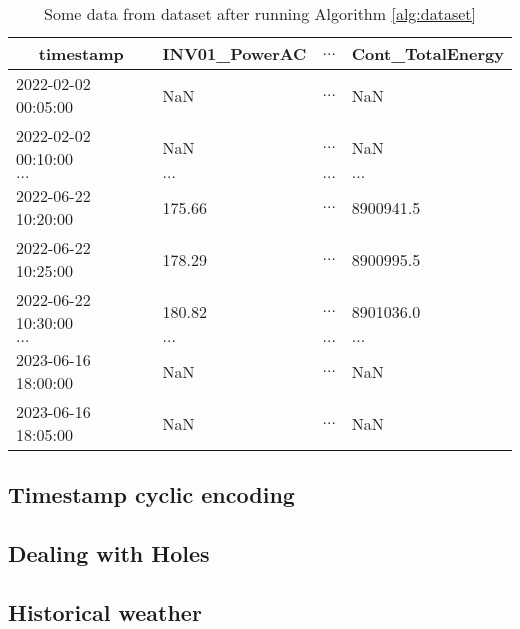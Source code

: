 \begin{table}[H]
	\begin{center}
		\begin{tabular}[c]{l|l|l|l}
			\hline
			\multicolumn{1}{c|}{\textbf{timestamp}}      &
			\multicolumn{1}{c|}{\textbf{INV01\_PowerAC}} &
			\multicolumn{1}{c|}{\textbf{$\ldots$}}       &
			\multicolumn{1}{c}{\textbf{Cont\_TotalEnergy}}                                 \\
			\hline
			2022-02-02 00:05:00                          & NaN      & $\ldots$ & NaN       \\
			2022-02-02 00:10:00                          & NaN      & $\ldots$ & NaN       \\
			$\ldots$                                     & $\ldots$ & $\ldots$ & $\ldots$  \\
			2022-06-22 10:20:00                          & 175.66   & $\ldots$ & 8900941.5 \\
			2022-06-22 10:25:00                          & 178.29   & $\ldots$ & 8900995.5 \\
			2022-06-22 10:30:00                          & 180.82   & $\ldots$ & 8901036.0 \\
			$\ldots$                                     & $\ldots$ & $\ldots$ & $\ldots$  \\
			2023-06-16 18:00:00                          & NaN      & $\ldots$ & NaN       \\
			2023-06-16 18:05:00                          & NaN      & $\ldots$ & NaN       \\
		\end{tabular}
	\end{center}
	\caption{Some data from dataset after running Algorithm \ref{alg:dataset}}\label{tab:datasetfinalvalues}
\end{table}

\subsection{Timestamp cyclic encoding}


\subsection{Dealing with Holes}
\subsection{Historical weather}
